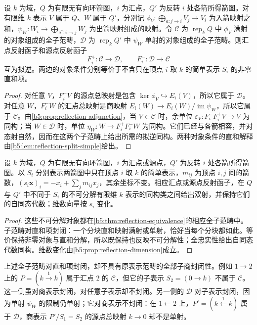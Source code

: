 \begin{theorem}[反射等价]\label{b5:thm:reflection-equivalence}
	设 \(k\) 为域，\(Q\) 为有限无有向环箭图，\(i\) 为汇点，\(Q'\) 为反转 \(i\) 处各箭所得箭图。对有限维 \(k\) 表示 \(V\) 属于 \(Q\)、\(W\) 属于 \(Q'\)，分别记 \(\phi_V:\bigoplus_{a:j\to i}V_j\to V_i\) 为入箭映射之和，\(\psi_W:W_i\to\bigoplus_{a^*:i\to j}W_j\) 为出箭映射组成的映射。令 \(\mathcal C\) 为 \(\operatorname{rep}_k Q\) 中 \(\phi_V\) 满射的对象组成的全子范畴，\(\mathcal D\) 为 \(\operatorname{rep}_k Q'\) 中 \(\psi_W\) 单射的对象组成的全子范畴。则汇点反射函子和源点反射函子
	\[
		F_i^+:\mathcal C\longrightarrow\mathcal D,\qquad F_i^-:\mathcal D\longrightarrow\mathcal C
	\]
	互为拟逆。两边的对象条件分别等价于不含只在顶点 \(i\) 取 \(k\) 的简单表示 \(S_i\) 的非零直和项。
\end{theorem}
\begin{proof}
	对任意 \(V\)，\(F_i^+V\) 的源点总映射是包含 \(\ker\phi_V\hookrightarrow E_i(V)\)，所以它属于 \(\mathcal D\)。对任意 \(W\)，\(F_i^-W\) 的汇点总映射是商映射 \(E_i(W)\to E_i(W)/\operatorname{im}\psi_W\)，所以它属于 \(\mathcal C\)。由\cref{b5:prop:reflection-adjunction}，当 \(V\in\mathcal C\) 时，余单位 \(\varepsilon_V:F_i^-F_i^+V\to V\) 为同构；当 \(W\in\mathcal D\) 时，单位 \(\eta_W:W\to F_i^+F_i^-W\) 为同构。它们已经与各箭相容，并对态射自然，因而在这两个子范畴上给出所需的拟逆同构。两种对象条件的直和解释由\cref{b5:lem:reflection-split-simple}给出。
\end{proof}

\begin{corollary}\label{b5:cor:reflection-indecomposables}
	设 \(k\) 为域，\(Q\) 为有限无有向环箭图，\(i\) 为汇点或源点，\(Q'\) 为反转 \(i\) 处各箭所得箭图。以 \(S_i\) 分别表示两箭图中只在顶点 \(i\) 取 \(k\) 的简单表示，\(m_{ij}\) 为顶点 \(i,j\) 间的箭数，\((s_i\mathbf x)_i=-x_i+\sum_jm_{ij}x_j\)，其余坐标不变。相应汇点或源点反射函子，在 \(Q\) 与 \(Q'\) 中不同于 \(S_i\) 的不可分解有限维 \(k\) 表示的同构类之间给出双射，并保持它们的自同态代数；维数向量按 \(s_i\) 变化。
\end{corollary}
\begin{proof}
	这些不可分解对象都在\cref{b5:thm:reflection-equivalence}的相应全子范畴中。子范畴对直和项封闭：一个分块直和映射满射或单射，恰好当每个分块都如此。等价保持非零对象与直和分解，所以既保持也反映不可分解性；全忠实性给出自同态代数同构。维数变化由\cref{b5:prop:reflection-dimension}成立。
\end{proof}

上述全子范畴对直和项封闭，却不具有原表示范畴的全部子商封闭性。例如 \(1\to2\) 上的 \(P=(k\xrightarrow{1}k)\) 属于汇点 \(2\) 的 \(\mathcal C\)，但它的子表示 \(S_2=(0\to k)\) 不属于 \(\mathcal C\)。这一侧虽对商表示封闭，对任意子表示却不封闭。另一侧的 \(\mathcal D\) 对子表示封闭，因为单射 \(\psi_W\) 的限制仍单射；它对商表示不封闭：在 \(1\leftarrow2\) 上，\(P'=(k\xleftarrow{1}k)\) 属于 \(\mathcal D\)，商表示 \(P'/S_1=S_2\) 的源点总映射 \(k\to0\) 却不是单射。

